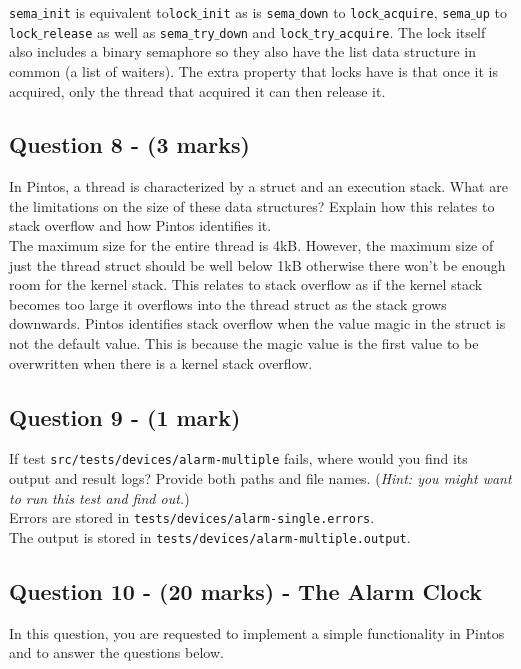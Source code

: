 \documentclass[a4paper,12pt]{article}
\begin{document}
\texttt{sema$\_$init} is equivalent to\texttt{lock$\_$init} as is \texttt{sema$\_$down} to \texttt{lock$\_$acquire}, \texttt{sema$\_$up} to \texttt{lock$\_$release} as well as \texttt{sema$\_$try$\_$down} and \texttt{lock$\_$try$\_$acquire}. The lock itself also includes a binary semaphore so they also have the list data structure in common (a list of waiters).
The extra property that locks have is that once it is acquired, only the thread that acquired it can then release it.

\subsection*{Question 8 - (3 marks)}
In Pintos, a thread is characterized by a struct and an execution stack.
What are the limitations on the size of these data structures?
Explain how this relates to stack overflow and how Pintos identifies it. \\

The maximum size for the entire thread is 4kB. However, the maximum size of just the thread struct should be well below 1kB otherwise there won't be enough room for the kernel stack. This relates to stack overflow as if the kernel stack becomes too large it overflows into the thread struct as the stack grows downwards. Pintos identifies stack overflow when the value magic in the struct is not the default value. This is because the magic value is the first value to be overwritten when there is a kernel stack overflow.

\subsection*{Question 9 - (1 mark)}
If test \texttt{src/tests/devices/alarm-multiple} fails, where would you find its output and result logs?
Provide both paths and file names.
(\textit{Hint: you might want to run this test and find out.}) \\

Errors are stored in \texttt{tests/devices/alarm-single.errors}. \\
The output is stored in \texttt{tests/devices/alarm-multiple.output}.

\subsection*{Question 10 - (20 marks) - The Alarm Clock}
In this question, you are requested to implement a simple functionality in Pintos and to answer the questions below.
\end{document}
